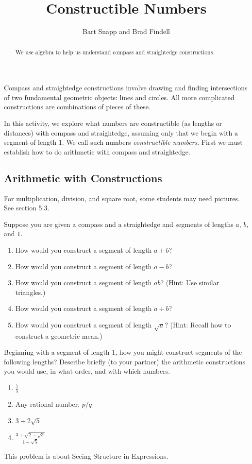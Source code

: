 \documentclass[nooutcomes]{ximera}
\title{Constructible Numbers}
\author{Bart Snapp and Brad Findell}
\begin{document}
\begin{abstract}
  We use algebra to help us understand compass and straightedge
  constructions.
\end{abstract}
\maketitle

Compass and straightedge constructions involve drawing and finding intersections of two fundamental geometric objects:  lines and circles.  All more complicated constructions are combinations of pieces of these.  

In this activity, we explore what numbers are constructible (as lengths or distances) with compass and straightedge, assuming only that we begin with a segment of length 1.  We call such numbers \textit{constructible numbers}.  First we must establish how to do arithmetic with compass and straightedge.  

\subsection*{Arithmetic with Constructions}
\begin{teachingnote}
For multiplication, division, and square root, some students may need pictures.  See section 5.3.
\end{teachingnote}
\begin{problem}
Suppose you are given a compass and a straightedge and segments of lengths $a$, $b$, and $1$.  
\begin{enumerate}
\item How would you construct a segment of length $a+b$? 
\item How would you construct a segment of length $a-b$? 
\item How would you construct a segment of length $ab$?  (Hint:  Use similar triangles.)  
\item How would you construct a segment of length $a\div b$? 
\item How would you construct a segment of length $\sqrt{a}$?  (Hint: Recall how to construct a geometric mean.)  
\end{enumerate}
\end{problem}

\begin{problem}
Beginning with a segment of length 1, how you might construct segments of the following lengths?  Describe briefly (to your partner) the arithmetic constructions you would use, in what order, and with which numbers.  
\begin{enumerate}
\item $\frac{7}{5}$
\item Any rational number, $p/q$
\item $3+2\sqrt{5}$
\item $\frac{3 + \sqrt{2-\sqrt{3}}}{1+\sqrt{5}}$
\end{enumerate}
\end{problem}
\begin{teachingnote}
This problem is about Seeing Structure in Expressions.
\end{teachingnote}
\end{document}
